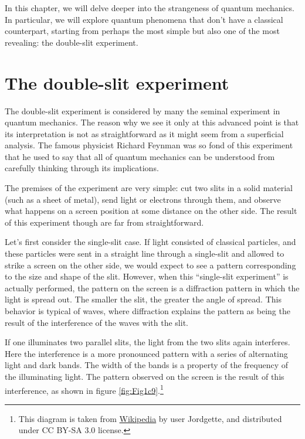 \documentclass[
  9pt,
]{extbook}
\theoremstyle{definition}
\theoremstyle{definition}
\theoremstyle{definition}
\theoremstyle{remark}
\begin{document}
In this chapter, we will delve deeper into the strangeness of quantum mechanics. In particular, we will explore quantum phenomena that don't have a classical counterpart, starting from perhaps the most simple but also one of the most revealing: the double-slit experiment.

\hypertarget{the-double-slit-experiment}{%
\section{The double-slit experiment}\label{the-double-slit-experiment}}

The double-slit experiment is considered by many the seminal experiment in quantum mechanics. The reason why we see it only at this advanced point is that its interpretation is not as straightforward as it might seem from a superficial analysis. The famous physicist Richard Feynman was so fond of this experiment that he used to say that all of quantum mechanics can be understood from carefully thinking through its implications.

The premises of the experiment are very simple: cut two slits in a solid material (such as a sheet of metal), send light or electrons through them, and observe what happens on a screen position at some distance on the other side. The result of this experiment though are far from straightforward.

Let's first consider the single-slit case. If light consisted of classical particles, and these particles were sent in a straight line through a single-slit and allowed to strike a screen on the other side, we would expect to see a pattern corresponding to the size and shape of the slit. However, when this ``single-slit experiment'' is actually performed, the pattern on the screen is a diffraction pattern in which the light is spread out. The smaller the slit, the greater the angle of spread. This behavior is typical of waves, where diffraction explains the pattern as being the result of the interference of the waves with the slit.

If one illuminates two parallel slits, the light from the two slits again interferes. Here the interference is a more pronounced pattern with a series of alternating light and dark bands. The width of the bands is a property of the frequency of the illuminating light. The pattern observed on the screen is the result of this interference, as shown in figure \ref{fig:Fig1c9}.\footnote{This diagram is taken from \href{https://en.wikipedia.org/wiki/Double-slit_experiment\#/media/File:Single_slit_and_double_slit2.jpg}{Wikipedia} by user Jordgette, and distributed under CC BY-SA 3.0 license.}
\end{document}
